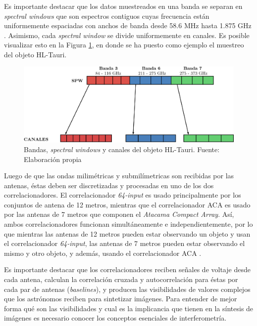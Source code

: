 Es importante destacar que los datos muestreados en una banda se separan en \textit{spectral windows} que son espectros contiguos cuyas frecuencia están uniformemente espaciadas con anchos de banda desde 58.6 MHz hasta 1.875 GHz \citep{alma-handbook}. Asimismo, cada \textit{spectral window} se divide uniformemente en canales. Es posible visualizar esto en la Figura \ref{fig:division}, en donde se ha puesto como ejemplo el muestreo del objeto HL-Tauri.

\begin{figure}[h!]
\centering
\includegraphics[scale=0.15]{images/frecuencias.png}
\caption{Bandas, \textit{spectral windows} y canales del objeto HL-Tauri. Fuente: Elaboración propia}
\label{fig:division}
\end{figure}




Luego de que las ondas milimétricas y submilímetricas son recibidas por las antenas, éstas deben ser discretizadas y procesadas en uno de los dos correlacionadores. El correlacionador \textit{64-input} es usado principalmente por los conjuntos de antena de 12 metros, mientras que el correlacionador ACA es usado por las antenas de 7 metros que componen el \textit{Atacama Compact Array}. Así, ambos correlacionadores funcionan simultáneamente e independientemente, por lo que mientras las antenas de 12 metros pueden estar observando un objeto y usan el correlacionador \textit{64-input}, las antenas de 7 metros pueden estar observando el mismo y otro objeto, y además, usando el correlacionador ACA \citep{alma-handbook}.

Es importante destacar que los correlacionadores reciben señales de voltaje desde cada antena, calculan la correlación cruzada y autocorrelación para éstas por cada par de antenas (\textit{baselines}), y producen las visibilidades de valores complejos que los astrónomos reciben para sintetizar imágenes. Para entender de mejor forma qué son las visibilidades y cual es la implicancia que tienen en la síntesis de imágenes es necesario conocer los conceptos esenciales de interferometría.

